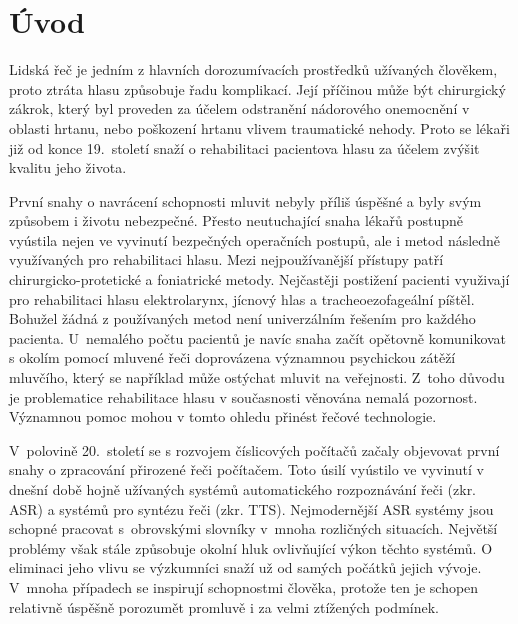 \chapter{Úvod}
\label{chap:introduction}

Lidská řeč je jedním z hlavních dorozumívacích prostředků užívaných člověkem, proto
ztráta hlasu způsobuje řadu komplikací. Její příčinou může být chirurgický zákrok, který byl proveden za účelem odstranění nádorového onemocnění v oblasti hrtanu, nebo
poškození hrtanu vlivem traumatické nehody. Proto se lékaři již od konce 19.~století snaží o rehabilitaci pacientova hlasu za účelem zvýšit kvalitu jeho života. 

První snahy o navrácení schopnosti mluvit nebyly příliš úspěšné a byly svým
způsobem i životu nebezpečné. Přesto neutuchající snaha lékařů postupně
vyústila nejen ve vyvinutí bezpečných operačních postupů, ale i metod následně využívaných pro rehabilitaci hlasu. Mezi nejpoužívanější přístupy patří chirurgicko-protetické a foniatrické metody.
Nejčastěji postižení pacienti využivají pro rehabilitaci hlasu elektrolarynx, jícnový hlas a tracheoezofageální píštěl. Bohužel žádná z používaných metod není univerzálním řešením pro každého pacienta.
U~nemalého počtu pacientů je navíc snaha začít opětovně komunikovat s okolím pomocí mluvené řeči doprovázena významnou psychickou zátěží mluvčího, který se například může ostýchat mluvit na veřejnosti. 
Z~toho důvodu je problematice rehabilitace hlasu v současnosti věnována nemalá pozornost. Významnou pomoc mohou v tomto ohledu přinést řečové technologie.

V~polovině 20.~století se s rozvojem číslicových počítačů začaly objevovat první
snahy o zpracování přirozené řeči počítačem. Toto úsilí vyústilo ve vyvinutí v dnešní
době hojně užívaných systémů automatického rozpoznávání řeči (zkr. ASR) a systémů pro syntézu
řeči (zkr. TTS). Nejmodernější ASR systémy jsou schopné pracovat s~obrovskými
slovníky v~mnoha rozličných situacích. Největší problémy však stále způsobuje
okolní hluk ovlivňující výkon těchto systémů. O eliminaci jeho vlivu se
výzkumníci snaží už od samých počátků jejich vývoje. V~mnoha případech se
inspirují schopnostmi člověka, protože ten je schopen relativně úspěšně
porozumět promluvě i za velmi ztížených podmínek. 


